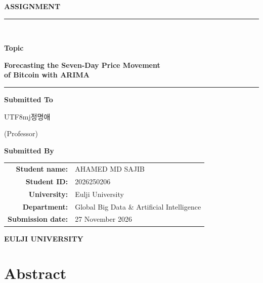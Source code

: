 \documentclass[11pt,a4paper]{article}
\begin{document}
\begin{titlepage}
\centering
\vspace*{0.5cm}
{\color{navy}\Huge\bfseries ASSIGNMENT\par}
\vspace{0.8cm}
{\color{navy}\rule{\linewidth}{1.2pt}}\\[0.6cm]
{\large\bfseries Topic\par}
\vspace{0.3cm}
{\color{navy}\LARGE\bfseries Forecasting the Seven-Day Price Movement\\[0.2cm] of Bitcoin with ARIMA\par}
\vspace{0.4cm}
{\color{navy}\rule{\linewidth}{1.2pt}}
\vfill
{\large\bfseries\color{navy} Submitted To\par}
\vspace{0.4cm}
{\Large \begin{CJK}{UTF8}{mj}정명애\end{CJK} (Professor)\par}
\vfill
{\large\bfseries\color{navy} Submitted By\par}
\vspace{0.4cm}
{\large\renewcommand{\arraystretch}{1.5}
\begin{tabular}{rl}
\textbf{Student name:} & AHAMED MD SAJIB \\
\textbf{Student ID:} & 2026250206 \\
\textbf{University:} & Eulji University \\
\textbf{Department:} & Global Big Data \& Artificial Intelligence \\
\textbf{Submission date:} & 27 November 2026 \\
\end{tabular}\par}
\vfill
{\color{navy}\LARGE\bfseries EULJI UNIVERSITY\par}
\end{titlepage}
\tableofcontents
\clearpage
\listoffigures
\listoftables
\clearpage
{}


\section*{Abstract}
\end{document}
